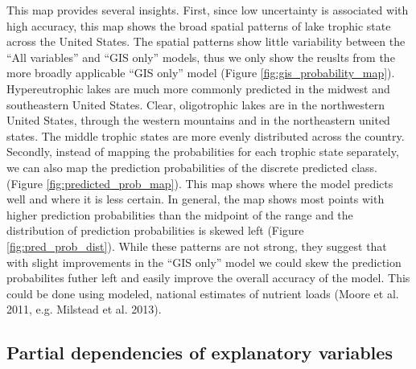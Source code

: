 \documentclass[12pt,]{article}
\begin{document}
This map provides several insights. First, since low uncertainty is
associated with high accuracy, this map shows the broad spatial patterns
of lake trophic state across the United States. The spatial patterns
show little variability between the ``All variables'' and ``GIS only''
models, thus we only show the reuslts from the more broadly applicable
``GIS only'' model (Figure \ref{fig:gis_probability_map}).
Hypereutrophic lakes are much more commonly predicted in the midwest and
southeastern United States. Clear, oligotrophic lakes are in the
northwestern United States, through the western mountains and in the
northeastern united states. The middle trophic states are more evenly
distributed across the country. Secondly, instead of mapping the
probabilities for each trophic state separately, we can also map the
prediction probabilities of the discrete predicted class. (Figure
\ref{fig:predicted_prob_map}). This map shows where the model predicts
well and where it is less certain. In general, the map shows most points
with higher prediction probabilities than the midpoint of the range and
the distribution of prediction probabilities is skewed left (Figure
\ref{fig:pred_prob_dist}). While these patterns are not strong, they
suggest that with slight improvements in the ``GIS only'' model we could
skew the prediction probabilites futher left and easily improve the
overall accuracy of the model. This could be done using modeled,
national estimates of nutrient loads (Moore et al. 2011, e.g. Milstead
et al. 2013).

\subsection{Partial dependencies of explanatory
variables}\label{partial-dependencies-of-explanatory-variables}
\end{document}
